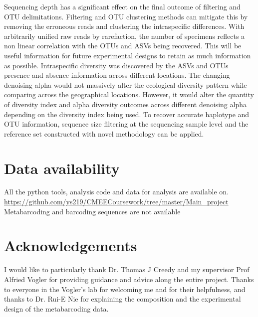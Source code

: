 \documentclass[11pt, a4paper]{article}
\begin{document}
Sequencing depth has a significant effect on the final outcome of filtering and OTU delimitations. Filtering and OTU clustering methods can mitigate this by removing the erroneous reads and clustering the intraspecific differences. With arbitrarily unified raw reads by rarefaction, the number of specimens reflects a non linear correlation with the OTUs and ASVs being recovered. This will be useful information for future experimental designs to retain as much information as possible. Intraspecific diversity was discovered by the ASVs and OTUs presence and absence information across different locations. The changing denoising alpha would not massively alter the ecological diversity pattern while comparing across the geographical locations. However, it would alter the quantity of diversity index and alpha diversity outcomes across different denoising alpha depending on the diversity index being used. To recover accurate haplotype and OTU information, sequence size filtering at the sequencing sample level and the reference set constructed with novel methodology can be applied.

\section{Data availability}
All the python tools, analysis code and data for analysis are available on.    
\url{https://github.com/ys219/CMEECoursework/tree/master/Main_project}
Metabarcoding and barcoding sequences are not available

\section{Acknowledgements}
I would like to particularly thank Dr. Thomas J Creedy and my supervisor Prof Alfried Vogler for providing guidance and advice along the entire project. Thanks to everyone in the Vogler’s lab for welcoming me and for their helpfulness, and thanks to Dr. Rui-E Nie for explaining the composition and the experimental design of the metabarcoding data.









\vfill %
\end{document}
